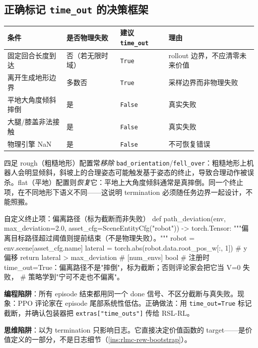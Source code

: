 \subsection{正确标记 \texttt{time\_out} 的决策框架}
\label{sec:rlmc-rew-termdecide}

\begin{center}
\small
\begin{tabular}{@{}llll@{}}
\toprule
条件 & 是否物理失败 & 建议 \verb|time_out| & 理由 \\
\midrule
固定回合长度到达 & 否（若无限时域） & \verb|True| & rollout 边界，不应清零未来价值 \\
离开生成地形边界 & 多数否 & \verb|True| & 采样边界而非物理失败 \\
平地大角度倾斜摔倒 & 是 & \verb|False| & 真实失败 \\
大腿/膝盖非法接触 & 是 & \verb|False| & 真实失败 \\
物理引擎 NaN & 是 & \verb|False| & 不可恢复错误 \\
\bottomrule
\end{tabular}
\end{center}

\begin{insight}\label{ins:rlmc-rew-terrain}
四足 rough（粗糙地形）配置常\emph{移除} \verb|bad_orientation|/\verb|fell_over|：粗糙地形上机器人会明显倾斜，斜坡上的合理姿态可能触发基于姿态的终止，导致合理动作被误杀。flat（平地）配置则\emph{恢复}它：平地上大角度倾斜通常是真摔倒。同一个终止项，在不同地形下语义不同——这说明 termination 必须随任务边界一起设计，不能照搬。
\end{insight}

\begin{codebox}[Python]{自定义终止项：偏离路径（标为截断而非失败）}
def path_deviation(env, max_deviation=2.0,
                   asset_cfg=SceneEntityCfg("robot")) -> torch.Tensor:
    """偏离目标路径超过阈值则提前结束（不是物理失败）。"""
    robot = env.scene[asset_cfg.name]
    lateral = torch.abs(robot.data.root_pos_w[:, 1])           # y 偏移
    return lateral > max_deviation                             # [num_envs] bool
# 注册时 time_out=True：偏离路径不是"摔倒"，标为截断；否则评论家会把它当 V=0 失败，
# 策略学到"宁可不走也不偏离"。
\end{codebox}

\begin{pitfall}[两个高频终止错误]
\textbf{编程陷阱}：所有 episode 结束都用同一个 done 信号、不区分截断与真失败。现象：PPO 评论家在 episode 尾部系统性低估。正确做法：用 \verb|time_out=True| 标记截断，并确认包装器把 \verb|extras["time_outs"]| 传给 RSL-RL。

\textbf{思维陷阱}：以为 termination 只影响日志。它直接决定价值函数的 target——是价值定义的一部分，不是日志细节（\cref{ins:rlmc-rew-bootstrap}）。
\end{pitfall}

